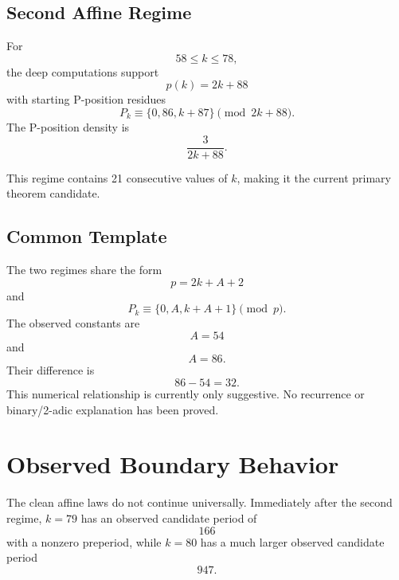 \documentclass[11pt]{article}
\begin{document}
\subsection{Second Affine Regime}
For
\begin{equation}
    58\le k\le78,
\end{equation}
the deep computations support
\begin{equation}
\boxed{p(k)=2k+88}
\end{equation}
with starting P-position residues
\begin{equation}
\boxed{
    P_k\equiv\{0,86,k+87\}\pmod{2k+88}.
}
\end{equation}
The P-position density is
\begin{equation}
    \frac{3}{2k+88}.
\end{equation}

This regime contains 21 consecutive values of $k$, making it the current primary theorem candidate.

\subsection{Common Template}
The two regimes share the form
\begin{equation}
\boxed{p=2k+A+2}
\end{equation}
and
\begin{equation}
\boxed{
    P_k\equiv\{0,A,k+A+1\}\pmod p.
}
\end{equation}
The observed constants are
\begin{equation}
    A=54
\end{equation}
and
\begin{equation}
    A=86.
\end{equation}
Their difference is
\begin{equation}
    86-54=32.
\end{equation}
This numerical relationship is currently only suggestive. No recurrence or binary/2-adic explanation has been proved.

\section{Observed Boundary Behavior}

The clean affine laws do not continue universally. Immediately after the second regime, $k=79$ has an observed candidate period of
\begin{equation}
    166
\end{equation}
with a nonzero preperiod, while $k=80$ has a much larger observed candidate period
\begin{equation}
    947.
\end{equation}
\end{document}
